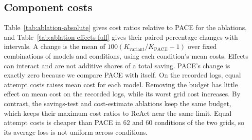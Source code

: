 \subsection{Component costs}
\label{app:ablation-absolute}
Table~\ref{tab:ablation-absolute} gives cost ratios relative to PACE for the ablations, and Table~\ref{tab:ablation-effects-full} gives their paired percentage changes with intervals.
A change is the mean of $100(K_{\mathrm{variant}}/K_{\mathrm{PACE}}-1)$ over fixed combinations of models and conditions, using each condition's mean costs.
Effects can interact and are not additive shares of a total saving.
PACE's change is exactly zero because we compare PACE with itself.
On the recorded logs, equal attempt costs raises mean cost for each model.
Removing the budget has little effect on mean cost on the recorded logs, while its worst grid cost increases.
By contrast, the savings-test and cost-estimate ablations keep the same budget, which keeps their maximum cost ratios to ReAct near the same limit.
Equal attempt costs is cheaper than PACE in $62$ and $60$ conditions of the two grids, so its average loss is not uniform across conditions.


